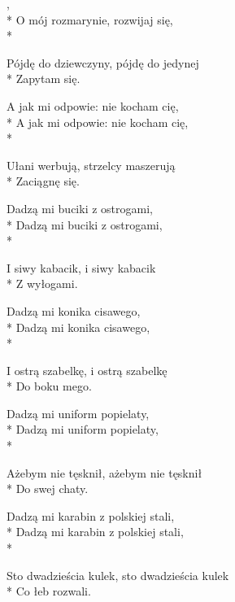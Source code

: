 \begin{lyrics}[longestline={Sto dwadzieścia kulek, sto dwadzieścia kulek}]

,\\*
O mój rozmarynie, rozwijaj się,\\*
\begin{markverses}%
Pójdę do dziewczyny, pójdę do jedynej\\*
Zapytam się.
\end{markverses}

A jak mi odpowie: nie kocham cię,\\*
A jak mi odpowie: nie kocham cię,\\*
\begin{markverses}%
Ułani werbują, strzelcy maszerują\\*
Zaciągnę się.
\end{markverses}

Dadzą mi buciki z ostrogami,\\*
Dadzą mi buciki z ostrogami,\\*
\begin{markverses}%
I siwy kabacik, i siwy kabacik\\*
Z wyłogami.
\end{markverses}

Dadzą mi konika cisawego,\\*
Dadzą mi konika cisawego,\\*
\begin{markverses}%
I ostrą szabelkę, i ostrą szabelkę\\*
Do boku mego.
\end{markverses}

Dadzą mi uniform popielaty,\\*
Dadzą mi uniform popielaty,\\*
\begin{markverses}%
Ażebym nie tęsknił, ażebym nie tęsknił\\*
Do swej chaty.
\end{markverses}

Dadzą mi karabin z polskiej stali,\\*
Dadzą mi karabin z polskiej stali,\\*
\begin{markverses}%
Sto dwadzieścia kulek, sto dwadzieścia kulek\\*
Co łeb rozwali.
\end{markverses}

\breaklyrics


\end{lyrics}
